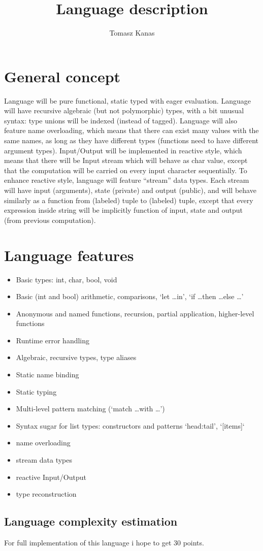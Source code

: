 \documentclass[11pt]{article}
\title{Language description}
\author{Tomasz Kanas}
\begin{document}
\maketitle
\section{General concept}
Language will be pure functional, static typed with eager evaluation. Language will have recursive algebraic (but not polymorphic) types, with a bit unusual syntax: type unions will be indexed (instead of tagged). Language will also feature name overloading, which means that there can exist many values with the same names, as long as they have different types (functions need to have different argument types). Input/Output will be implemented in reactive style, which means that there will be Input stream which will behave as char value, except that the computation will be carried on every input character sequentially. To enhance reactive style, language will feature ``stream'' data types. Each stream will have input (arguments), state (private) and output (public), and will behave similarly as a function from (labeled) tuple to (labeled) tuple, except that every expression inside string will be implicitly function of input, state and output (from previous computation).
\section{Language features}
\begin{itemize}
    \item Basic types: int, char, bool, void
    \item Basic (int and bool) arithmetic, comparisons, `let \dots in', `if \dots then \dots else \dots'
    \item Anonymous and named functions, recursion, partial application, higher-level functions
    \item Runtime error handling
    \item Algebraic, recursive types, type aliases
    \item Static name binding
    \item Static typing
    \item Multi-level pattern matching (`match \dots with \dots')
    \item Syntax sugar for list types: constructors and patterns `head:tail', `[items]`
    \item name overloading
    \item stream data types
    \item reactive Input/Output
    \item type reconstruction
\end{itemize}

\subsection*{Language complexity estimation}
For full implementation of this language i hope to get 30 points.
\end{document}
